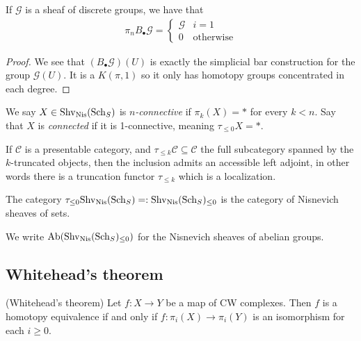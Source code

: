 \documentclass[11pt]{amsart}
\begin{document}
\begin{example} If $\mathcal{G}$ is a sheaf of discrete groups, we have that
\begin{align*}
    \pi_n B_\bullet \mathcal{G} = \begin{cases} \mathcal{G} & i=1 \\ 0 & \text{otherwise}
    \end{cases}
\end{align*}
\end{example}
\begin{proof} We see that $(B_\bullet \mathcal{G}) (U)$ is exactly the simplicial bar construction for the group $\mathcal{G}(U)$. It is a $K(\pi,1)$ so it only has homotopy groups concentrated in each degree.
\end{proof}



\begin{definition} \cite[6.5.1.10]{HTT} We say $X\in \mathrm{Shv}_{\mathrm{Nis}}(\mathrm{Sch}_S)$ is $n$\textit{-connective} if $\pi_k(X) = \ast$ for every $k<n$. Say that $X$ is \textit{connected} if it is 1-connective, meaning $\tau_{\le 0}X = \ast$.
\end{definition}

\begin{proposition} \cite[5.5.6.18]{HTT}
If $\mathscr{C}$ is a presentable category, and $\tau_{\le k} \mathscr{C} \subseteq \mathscr{C}$ the full subcategory spanned by the $k$-truncated objects, then the inclusion admits an accessible left adjoint, in other words there is a truncation functor $\tau_{\le k}$ which is a localization.
\end{proposition}



\begin{definition} The category $\tau_{\le 0}\mathrm{Shv}_{\mathrm{Nis}}(\mathrm{Sch}_S) =: \mathrm{Shv}_{\mathrm{Nis}}(\mathrm{Sch}_S)_{\le 0}$ is the category of Nisnevich sheaves of sets.
\end{definition}

\begin{notation} We write $\mathrm{Ab}(\mathrm{Shv}_{\mathrm{Nis}}(\mathrm{Sch}_S)_{\le 0})$ for the Nisnevich sheaves of abelian groups.
\end{notation}




\subsection{Whitehead's theorem}

\begin{theorem} (Whitehead's theorem) Let $f \colon X \to Y$ be a map of CW complexes. Then $f$ is a homotopy equivalence if and only if $f \colon \pi_i(X) \to \pi_i(Y)$ is an isomorphism for each $i\ge0$.
\end{theorem}
\end{document}
